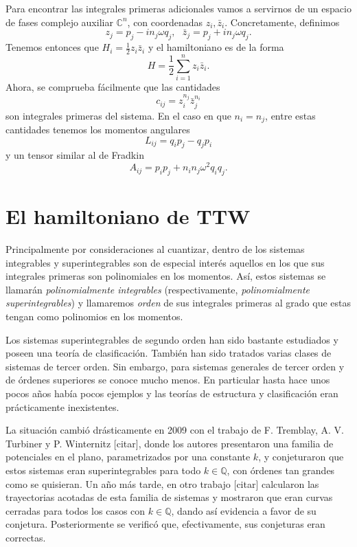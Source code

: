 \documentclass[12pt,a4paper,twocolumn,reqno]{amsart}
\theoremstyle{definition} \newtheorem{defn}[thm]{Definición}
\theoremstyle{definition} \newtheorem{ejemplo}[thm]{Ejemplo}
\theoremstyle{definition} \newtheorem{ejercicio}[thm]{Ejercicio}
\theoremstyle{remark} \newtheorem*{obs}{Observación}
\def\CC{\mathbb{C}}
\def\QQ{\mathbb{Q}}
\begin{document}
Para encontrar las integrales primeras adicionales vamos a servirnos de un espacio de fases complejo auxiliar $\CC^n$, con coordenadas $z_i, \bar{z}_i$. Concretamente, definimos
\begin{equation}
  z_j=p_j-in_j\omega q_j,\ \ \  \bar{z}_j=p_j+in_j\omega q_j.  
\end{equation}
Tenemos entonces que $H_i=\frac{1}{2}z_i\bar{z}_i$ y el hamiltoniano es de la forma
\begin{equation}
  H=\frac{1}{2}\sum_{i=1}^n z_i\bar{z}_i. 
\end{equation}
Ahora, se comprueba fácilmente que las cantidades
\begin{equation}
  c_{ij}=z_i^{n_j}\bar{z}_j^{n_i} 
\end{equation}
son integrales primeras del sistema. En el caso en que $n_i=n_j$, entre estas cantidades tenemos los momentos angulares
\begin{equation}
  L_{ij}=q_ip_j-q_jp_i 
\end{equation}
y un tensor similar al de Fradkin
\begin{equation}
  A_{ij}=p_ip_j+n_in_j\omega^2 q_iq_j. 
\end{equation}

\section{El hamiltoniano de TTW}
Principalmente por consideraciones al cuantizar, dentro de los sistemas integrables y superintegrables son de especial interés aquellos en los que sus integrales primeras son polinomiales en los momentos. Así, estos sistemas se llamarán \emph{polinomialmente integrables} (respectivamente, \emph{polinomialmente superintegrables}) y llamaremos \emph{orden} de sus integrales primeras al grado que estas tengan como polinomios en los momentos.

Los sistemas superintegrables de segundo orden han sido bastante estudiados y poseen una teoría de clasificación. También han sido tratados varias clases de sistemas de tercer orden. Sin embargo, para sistemas generales de tercer orden y de órdenes superiores se conoce mucho menos. En particular hasta hace unos pocos años había pocos ejemplos y las teorías de estructura y clasificación eran prácticamente inexistentes. 

La situación cambió drásticamente en 2009 con el trabajo de F. Tremblay, A. V. Turbiner y P. Winternitz [citar], donde los autores presentaron una familia de potenciales en el plano, parametrizados por una constante $k$, y conjeturaron que estos sistemas eran superintegrables para todo $k\in \QQ$, con órdenes tan grandes como se quisieran. Un año más tarde, en otro trabajo [citar] calcularon las trayectorias acotadas de esta familia de sistemas y mostraron que eran curvas cerradas para todos los casos con $k \in \QQ$, dando así evidencia a favor de su conjetura. Posteriormente se verificó que, efectivamente, sus conjeturas eran correctas.
\end{document}
